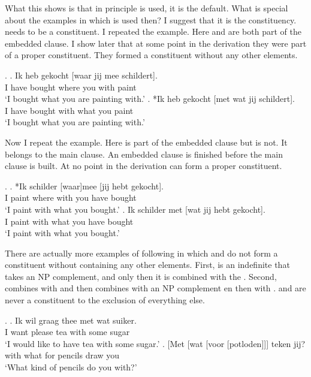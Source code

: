 \documentclass{article}
\begin{document}
What this shows is that in principle  is used, it is the default. What is special about the examples in which  is used then? I suggest that it is the constituency.  needs to be a constituent. I repeated the  example. Here  and  are both part of the embedded clause. I show later that at some point in the derivation they were part of a proper constituent. They formed a constituent without any other elements.

\ex.
\ag. Ik heb gekocht [waar jij mee schildert].\\
 I have bought where you with paint\\
 `I bought what you are painting with.'
\bg. *Ik heb gekocht [met wat jij schildert].\\
 I have bought with what you paint\\
 `I bought what you are painting with.'

 Now I repeat the  example. Here  is part of the embedded clause but  is not. It belongs to the main clause. An embedded clause is finished before the main clause is built. At no point in the derivation can   form a proper constituent.

\ex.
\ag. *Ik schilder [waar]mee [jij hebt gekocht].\\
 I paint {where with} you have bought\\
 `I paint with what you bought.'
\bg. Ik schilder met [wat jij hebt gekocht].\\
 I paint with what you have bought\\
 `I paint with what you bought.'

There are actually more examples of  following  in which  and  do not form a constituent without containing any other elements. First,  is an indefinite that takes an NP complement, and only then it is combined with the . Second,  combines with  and then combines with an NP complement en then with .  and  are never a constituent to the exclusion of everything else.

\ex.
\ag. Ik wil graag thee met wat suiker.\\
 I want please tea with some sugar\\
 `I would like to have tea with some sugar.'
\bg. [Met [wat [voor [potloden]]] teken jij?\\
 with what for pencils draw you\\
 `What kind of pencils do you with?'
\end{document}
